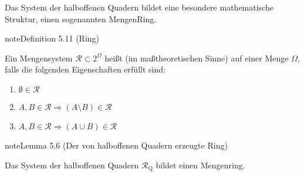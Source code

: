 \documentclass[letterpaper,10pt,german]{jupyterBook}
\begin{document}
\sphinxAtStartPar
Das System der halboffenen Quadern bildet eine besondere mathematische Struktur, einen sogenannten Mengen\sphinxhyphen{}Ring.
\label{masstheorie/masstheorie:def:ring}
\begin{sphinxadmonition}{note}{Definition 5.11 (Ring)}



\sphinxAtStartPar
Ein Mengensystem \(\mathcal{R} \subset 2^{\Omega}\) heißt  (im maßtheoretischen Sinne) auf einer Menge \(\Omega\), falls die folgenden Eigenschaften erfüllt sind:
\begin{enumerate}
%
\item {} 
\sphinxAtStartPar
\(\emptyset \in \mathcal{R}\)

\item {} 
\sphinxAtStartPar
\(A,B \in \mathcal{R} \Rightarrow (A \setminus B) \in \mathcal{R}\)

\item {} 
\sphinxAtStartPar
\(A,B \in \mathcal{R} \Rightarrow (A \cup B) \in \mathcal{R}\)

\end{enumerate}
\end{sphinxadmonition}
\label{masstheorie/masstheorie:lemma-19}
\begin{sphinxadmonition}{note}{Lemma 5.6 (Der von halboffenen Quadern erzeugte Ring)}



\sphinxAtStartPar
Das System der halboffenen Quadern \(\mathcal{R}_{\text{Q}}\) bildet einen Mengenring.
\end{sphinxadmonition}
\end{document}
